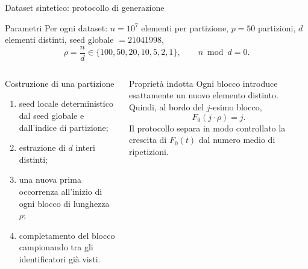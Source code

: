 \documentclass[aspectratio=169,11pt]{beamer}
\newcommand{\Fzero}{F_0}
\begin{document}
\begin{frame}{Dataset sintetico: protocollo di generazione}
  \begin{block}{Parametri}
    \small
    Per ogni dataset: \(n=10^7\) elementi per partizione, \(p=50\) partizioni, $d$ elementi distinti, seed globale
    \(=21041998\),
    \[
      \rho=\frac{n}{d}\in\{100,50,20,10,5,2,1\},
      \qquad
      n \bmod d = 0.
    \]
  \end{block}

  \begin{columns}[T,onlytextwidth]
      \begin{block}{Costruzione di una partizione}
        \small
        \begin{enumerate}
          \item seed locale deterministico dal seed globale e dall'indice di partizione;
          \item estrazione di \(d\) interi distinti;
          \item una nuova prima occorrenza all'inizio di ogni blocco di lunghezza \(\rho\);
          \item completamento del blocco campionando tra gli identificatori gi\`a visti.
        \end{enumerate}
      \end{block}
      \begin{block}{Propriet\`a indotta}
        \small
        Ogni blocco introduce esattamente un nuovo elemento distinto. Quindi, al bordo del
        \(j\)-esimo blocco,
        \[
          \Fzero(j\cdot\rho)=j.
        \]
        Il protocollo separa in modo controllato la crescita di \(\Fzero(t)\)
        dal numero medio di ripetizioni.
      \end{block}
  \end{columns}
\end{frame}
\end{document}
